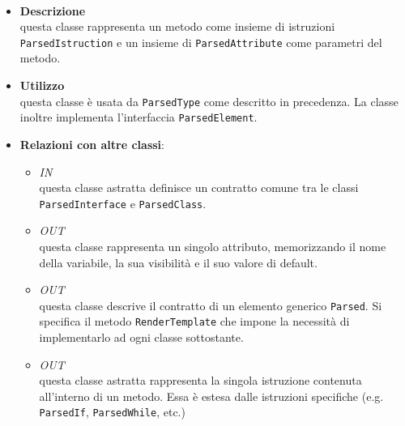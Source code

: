 \paragraph{}
\label{\nogloxy{SWEDesigner::Server::Project::ParsedMethod}}
\begin{itemize}
\item \textbf{Descrizione}\\
questa classe rappresenta un metodo come insieme di istruzioni \texttt{ParsedIstruction} e un insieme di \texttt{ParsedAttribute} come parametri del metodo.
\item \textbf{Utilizzo}\\
questa classe è usata da \texttt{ParsedType} come descritto in precedenza. La classe inoltre implementa l'interfaccia \texttt{ParsedElement}.
\item \textbf{Relazioni con altre classi}:
\begin{itemize}
\item \textit{IN} \hyperref[\nogloxy{SWEDesigner::Server::Project::ParsedType}]{}\\
questa classe astratta definisce un contratto comune tra le classi \texttt{ParsedInterface} e \texttt{ParsedClass}. 
\item \textit{OUT} \hyperref[\nogloxy{SWEDesigner::Server::Project::ParsedAttribute}]{}\\
questa classe rappresenta un singolo attributo, memorizzando il nome della variabile, la sua visibilità e il suo valore di default. 
\item \textit{OUT} \hyperref[\nogloxy{SWEDesigner::Server::Project::ParsedElement}]{}\\
questa classe descrive il contratto di un elemento generico \texttt{Parsed}. Si specifica il metodo \texttt{RenderTemplate} che impone la necessità di implementarlo ad ogni classe sottostante.
\item \textit{OUT} \hyperref[\nogloxy{SWEDesigner::Server::Project::ParsedInstruction}]{}\\
questa classe astratta rappresenta la singola istruzione contenuta all'interno di un metodo. Essa è estesa dalle istruzioni specifiche (e.g. \texttt{ParsedIf}, \texttt{ParsedWhile}, etc.)
\end{itemize}
\end{itemize}

